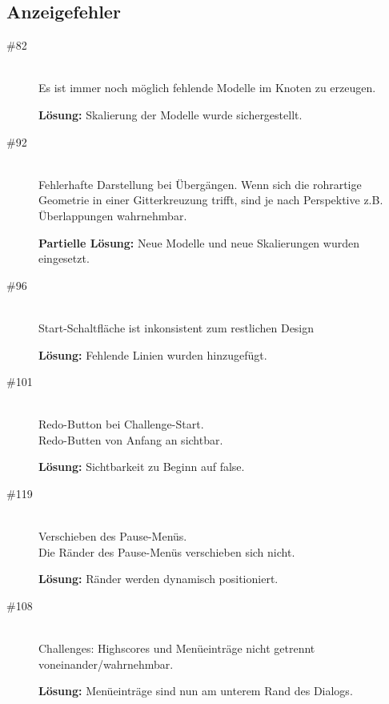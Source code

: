 %



\clearpage



\subsection*{Anzeigefehler}



\begin{description}


\item[\#82] \hfill \\
Es ist immer noch möglich \glqq fehlende Modelle im Knoten zu erzeugen\grqq.

{\bfseries Lösung:} Skalierung der Modelle wurde sichergestellt.


\item[\#92] \hfill \\
Fehlerhafte Darstellung bei Übergängen. Wenn sich die rohrartige Geometrie in einer Gitterkreuzung trifft, sind je nach Perspektive z.B. Überlappungen wahrnehmbar.

{\bfseries Partielle Lösung:} Neue Modelle und neue Skalierungen wurden eingesetzt.


\item[\#96] \hfill \\
\glqq Start\grqq-Schaltfläche ist inkonsistent zum restlichen Design

{\bfseries Lösung:} Fehlende Linien wurden hinzugefügt.


\item[\#101] \hfill \\
Redo-Button bei Challenge-Start.\\
Redo-Butten von Anfang an sichtbar.
 
{\bfseries Lösung:} Sichtbarkeit zu Beginn auf \glqq false\grqq.


\item[\#119] \hfill \\
Verschieben des Pause-Menüs. \\
Die Ränder des Pause-Menüs verschieben sich nicht.

{\bfseries Lösung:} Ränder werden dynamisch positioniert. 


\item[\#108] \hfill \\
Challenges: Highscores und Menüeinträge nicht getrennt voneinander/wahrnehmbar.
 
{\bfseries Lösung:} Menüeinträge sind nun am unterem Rand des Dialogs.
 
 
\end{description}



~\\


